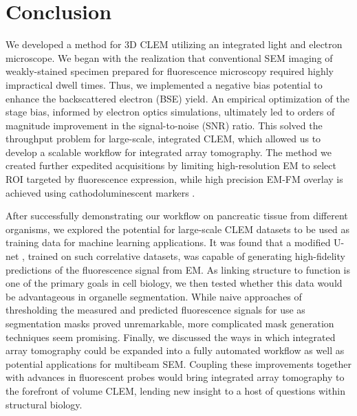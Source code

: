 \section{Conclusion}
\label{sec:5.3_conclusion}

We developed a method for 3D CLEM utilizing an integrated light and electron microscope. We began with the realization that conventional SEM imaging of weakly-stained specimen prepared for fluorescence microscopy required highly impractical dwell times. Thus, we implemented a negative bias potential to enhance the backscattered electron (BSE) yield. An empirical optimization of the stage bias, informed by electron optics simulations, ultimately led to orders of magnitude improvement in the signal-to-noise (SNR) ratio. This solved the throughput problem for large-scale, integrated CLEM, which allowed us to develop a scalable workflow for integrated array tomography. The method we created further expedited acquisitions by limiting high-resolution EM to select ROI targeted by fluorescence expression, while high precision EM-FM overlay is achieved using cathodoluminescent markers \cite{haring2017automated}. 

After successfully demonstrating our workflow on pancreatic tissue from different organisms, we explored the potential for large-scale CLEM datasets to be used as training data for machine learning applications. It was found that a modified U-net \cite{ronneberger2015u}, trained on such correlative datasets, was capable of generating high-fidelity predictions of the fluorescence signal from EM. As linking structure to function is one of the primary goals in cell biology, we then tested whether this data would be advantageous in organelle segmentation. While naive approaches of thresholding the measured and predicted fluorescence signals for use as segmentation masks proved unremarkable, more complicated mask generation techniques seem promising. Finally, we discussed the ways in which integrated array tomography could be expanded into a fully automated workflow as well as potential applications for multibeam SEM. Coupling these improvements together with advances in fluorescent probes would bring integrated array tomography to the forefront of volume CLEM, lending new insight to a host of questions within structural biology.
